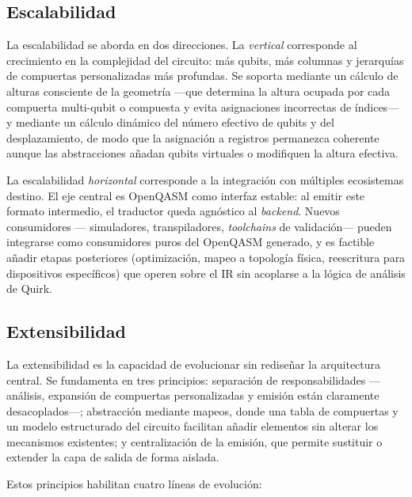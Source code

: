 \documentclass[11pt,a4paper]{article}
\begin{document}
\subsection{Escalabilidad}

La escalabilidad se aborda en dos direcciones. La \emph{vertical} corresponde al crecimiento
en la complejidad del circuito: más qubits, más columnas y jerarquías de compuertas
personalizadas más profundas. Se soporta mediante un cálculo de alturas consciente de la
geometría ---que determina la altura ocupada por cada compuerta multi-qubit o compuesta y
evita asignaciones incorrectas de índices--- y mediante un cálculo dinámico del número
efectivo de qubits y del desplazamiento, de modo que la asignación a registros permanezca
coherente aunque las abstracciones añadan qubits virtuales o modifiquen la altura efectiva.

La escalabilidad \emph{horizontal} corresponde a la integración con múltiples ecosistemas
destino. El eje central es OpenQASM como interfaz estable: al emitir este formato
intermedio, el traductor queda agnóstico al \emph{backend}. Nuevos consumidores ---
simuladores, transpiladores, \emph{toolchains} de validación--- pueden integrarse como
consumidores puros del OpenQASM generado, y es factible añadir etapas posteriores
(optimización, mapeo a topología física, reescritura para dispositivos específicos) que
operen sobre el IR sin acoplarse a la lógica de análisis de Quirk.

\subsection{Extensibilidad}

La extensibilidad es la capacidad de evolucionar sin rediseñar la arquitectura central.
Se fundamenta en tres principios: separación de responsabilidades ---análisis, expansión de
compuertas personalizadas y emisión están claramente desacoplados---; abstracción mediante
mapeos, donde una tabla de compuertas y un modelo estructurado del circuito facilitan añadir
elementos sin alterar los mecanismos existentes; y centralización de la emisión, que permite
sustituir o extender la capa de salida de forma aislada.

Estos principios habilitan cuatro líneas de evolución:
\end{document}

